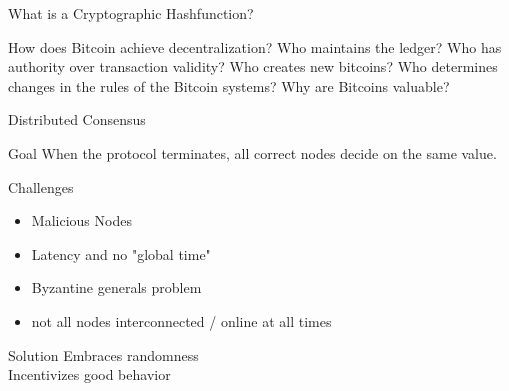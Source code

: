 \documentclass[12pt, usepdftitle=false]{beamer}
\newcommand{\backupend}{
   \setcounter{framenumber}{\value{finalframe}}
}
\begin{document}

\begin{frame}{What is a Cryptographic Hashfunction?}
\end{frame}


\begin{frame}{How does Bitcoin achieve decentralization?}
Who maintains the ledger?
Who has authority over transaction validity?
Who creates new bitcoins?
Who determines changes in the rules of the Bitcoin systems?
Why are Bitcoins valuable?

\end{frame}


\begin{frame}{Distributed Consensus}
	\begin{block}{Goal}
	When the protocol terminates, all correct nodes decide on the same value.	
	\end{block}
	
	\begin{block}{Challenges}
	\begin{itemize}
		\item Malicious Nodes
		\item Latency and no "global time"
		\item Byzantine generals problem
		\item not all nodes interconnected / online at all times
	\end{itemize}
	\end{block}

	\begin{block}{Solution}
		Embraces randomness\\
		Incentivizes good behavior
	\end{block}
\end{frame}

\backupend
\end{document}
